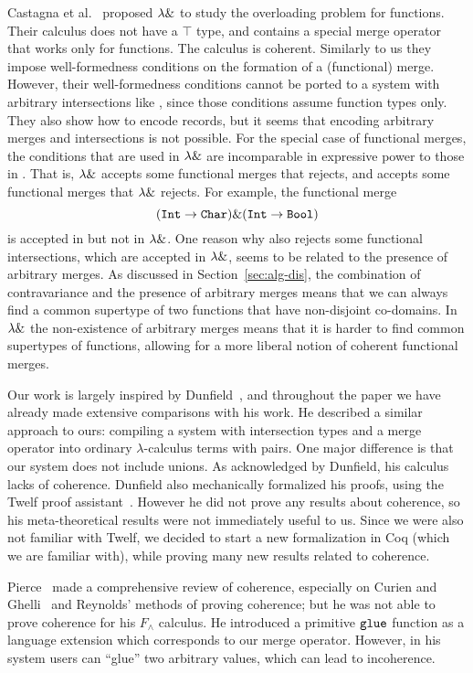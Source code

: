 Castagna et al.~\cite{Castagna92calculus} proposed $\lambda \&$ to study
the overloading problem for functions. Their calculus does not have a
$\top$ type, and contains a special merge operator that works only for
functions. The calculus is coherent. Similarly to us they impose
well-formedness conditions on the formation of a (functional)
merge. However, their well-formedness conditions cannot be ported to a
system with arbitrary intersections like \name, since those conditions
assume function types only.  They also show how to encode records, but
it seems that encoding arbitrary merges and intersections is not
possible.  For the special case of functional
merges, the conditions that are used in $\lambda \&$ are incomparable in
expressive power to those in \name. That is, $\lambda \&$ accepts some
functional merges that \name rejects, and \name accepts some
functional merges that $\lambda \&$ rejects. For example, the functional
merge
\[(\texttt{Int}\to\texttt{Char})\&(\texttt{Int}\to\texttt{Bool})\] 
\noindent is accepted in \name but not in $\lambda \&$. One reason 
why \name also rejects some functional intersections, which are 
accepted in $\lambda \&$, seems to be related to the presence of arbitrary 
merges. As discussed in Section~\ref{sec:alg-dis}, the combination of
contravariance and the presence of arbitrary merges means that we can
always find a common supertype of two functions that have non-disjoint
co-domains. In $\lambda \&$ the non-existence of arbitrary merges means
that it is harder to find common supertypes of functions, allowing for
a more liberal notion of coherent functional merges.  

Our work is largely inspired by
Dunfield~\cite{dunfield2014elaborating}, and throughout the paper we
have already made extensive comparisons with his work. He
described a similar approach to ours: compiling a system with intersection types
and a merge operator into ordinary $ \lambda $-calculus terms with pairs. One
major difference is that our system does not include unions. As
acknowledged by Dunfield, his calculus lacks of coherence. Dunfield
also mechanically formalized his proofs, using the Twelf proof
assistant~\cite{Pfenning99cade}. However he did not prove any results about
coherence, so his meta-theoretical results were not immediately
useful to us. Since we were also not familiar with Twelf, we decided to
start a new formalization in Coq (which we are familiar with), while
proving many new results related to coherence.


Pierce~\cite{pierce1991programming2} made a comprehensive review
of coherence, especially on Curien and Ghelli~\cite{curienl1990coherence} and
Reynolds' methods of proving coherence; but he was not able to prove coherence
for his $F_\wedge$ calculus. He introduced a primitive $\texttt{glue}$ function as
a language extension which corresponds to our merge operator. However, in his
system users can ``glue'' two arbitrary values, which can lead to incoherence.

